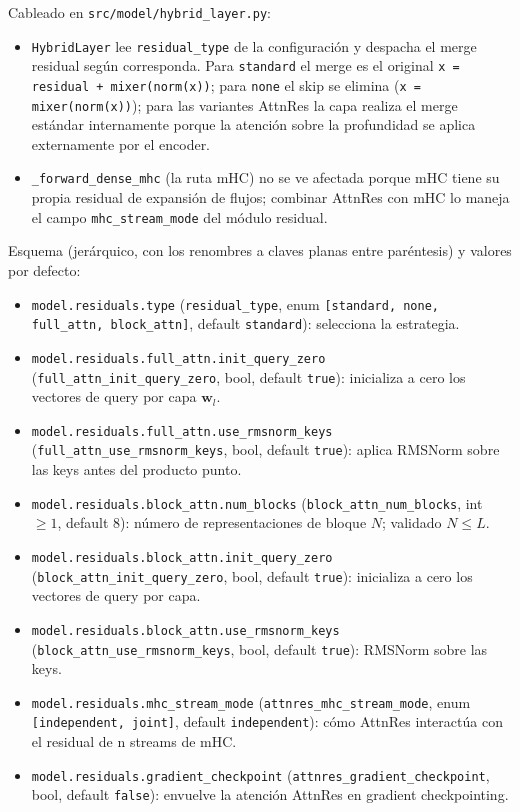 Cableado en \texttt{src/model/hybrid\_layer.py}:
\begin{itemize}[leftmargin=*]
    \item \texttt{HybridLayer} lee \texttt{residual\_type} de la
        configuración y despacha el merge residual según corresponda.
        Para \texttt{standard} el merge es el original
        \texttt{x = residual + mixer(norm(x))}; para \texttt{none} el
        skip se elimina (\texttt{x = mixer(norm(x))}); para las
        variantes AttnRes la capa realiza el merge estándar
        internamente porque la atención sobre la profundidad se aplica
        externamente por el encoder.
    \item \texttt{\_forward\_dense\_mhc} (la ruta mHC) no se ve
        afectada porque mHC tiene su propia residual de expansión de
        flujos; combinar AttnRes con mHC lo maneja el campo
        \texttt{mhc\_stream\_mode} del módulo residual.
\end{itemize}

Esquema (jerárquico, con los renombres a claves planas entre
paréntesis) y valores por defecto:
\begin{itemize}[leftmargin=*]
    \item \texttt{model.residuals.type} (\texttt{residual\_type},
        enum \texttt{[standard, none, full\_attn, block\_attn]},
        default \texttt{standard}): selecciona la estrategia.
    \item \texttt{model.residuals.full\_attn.init\_query\_zero}
        (\texttt{full\_attn\_init\_query\_zero}, bool, default
        \texttt{true}): inicializa a cero los vectores de query por
        capa $\mathbf{w}_l$.
    \item \texttt{model.residuals.full\_attn.use\_rmsnorm\_keys}
        (\texttt{full\_attn\_use\_rmsnorm\_keys}, bool, default
        \texttt{true}): aplica RMSNorm sobre las keys antes del
        producto punto.
    \item \texttt{model.residuals.block\_attn.num\_blocks}
        (\texttt{block\_attn\_num\_blocks}, int $\ge 1$, default
        $8$): número de representaciones de bloque $N$; validado
        $N \le L$.
    \item \texttt{model.residuals.block\_attn.init\_query\_zero}
        (\texttt{block\_attn\_init\_query\_zero}, bool, default
        \texttt{true}): inicializa a cero los vectores de query por
        capa.
    \item \texttt{model.residuals.block\_attn.use\_rmsnorm\_keys}
        (\texttt{block\_attn\_use\_rmsnorm\_keys}, bool, default
        \texttt{true}): RMSNorm sobre las keys.
    \item \texttt{model.residuals.mhc\_stream\_mode}
        (\texttt{attnres\_mhc\_stream\_mode}, enum
        \texttt{[independent, joint]}, default \texttt{independent}):
        cómo AttnRes interactúa con el residual de n streams de mHC.
    \item \texttt{model.residuals.gradient\_checkpoint}
        (\texttt{attnres\_gradient\_checkpoint}, bool, default
        \texttt{false}): envuelve la atención AttnRes en gradient
        checkpointing.
\end{itemize}


